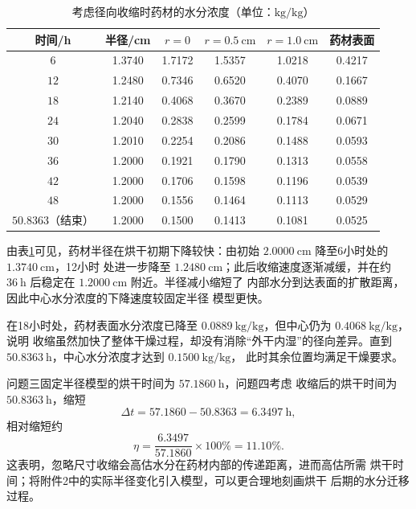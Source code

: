 \documentclass[12pt,a4paper]{article}
\begin{document}
\begin{table}[H]
\centering
\caption{考虑径向收缩时药材的水分浓度（单位：$\mathrm{kg/kg}$）}
\label{tab:q4-moisture}
\begin{tabular}{cccccc}
\toprule
时间/h & 半径/cm & $r=0$ & $r=0.5\ \mathrm{cm}$
& $r=1.0\ \mathrm{cm}$ & 药材表面\\
\midrule
$6$  & 1.3740 & 1.7172 & 1.5357 & 1.0218 & 0.4217\\
$12$ & 1.2480 & 0.7346 & 0.6520 & 0.4070 & 0.1667\\
$18$ & 1.2140 & 0.4068 & 0.3670 & 0.2389 & 0.0889\\
$24$ & 1.2040 & 0.2838 & 0.2599 & 0.1784 & 0.0671\\
$30$ & 1.2010 & 0.2254 & 0.2086 & 0.1488 & 0.0593\\
$36$ & 1.2000 & 0.1921 & 0.1790 & 0.1313 & 0.0558\\
$42$ & 1.2000 & 0.1706 & 0.1598 & 0.1196 & 0.0539\\
$48$ & 1.2000 & 0.1556 & 0.1464 & 0.1113 & 0.0529\\
$50.8363$（结束） & 1.2000 & 0.1500 & 0.1413 & 0.1081 & 0.0525\\
\bottomrule
\end{tabular}
\end{table}

由表\ref{tab:q4-moisture}可见，药材半径在烘干初期下降较快：由初始
$2.0000\ \mathrm{cm}$ 降至6小时处的 $1.3740\ \mathrm{cm}$，12小时
处进一步降至 $1.2480\ \mathrm{cm}$；此后收缩速度逐渐减缓，并在约
$36\ \mathrm{h}$ 后稳定在 $1.2000\ \mathrm{cm}$ 附近。半径减小缩短了
内部水分到达表面的扩散距离，因此中心水分浓度的下降速度较固定半径
模型更快。

在18小时处，药材表面水分浓度已降至
$0.0889\ \mathrm{kg/kg}$，但中心仍为 $0.4068\ \mathrm{kg/kg}$，说明
收缩虽然加快了整体干燥过程，却没有消除“外干内湿”的径向差异。直到
$50.8363\ \mathrm{h}$，中心水分浓度才达到 $0.1500\ \mathrm{kg/kg}$，
此时其余位置均满足干燥要求。

问题三固定半径模型的烘干时间为 $57.1860\ \mathrm{h}$，问题四考虑
收缩后的烘干时间为 $50.8363\ \mathrm{h}$，缩短
\begin{equation}
\Delta t=57.1860-50.8363=6.3497\ \mathrm{h},
\end{equation}
相对缩短约
\begin{equation}
\eta=\frac{6.3497}{57.1860}\times100\%=11.10\%.
\label{eq:q4-reduction}
\end{equation}
这表明，忽略尺寸收缩会高估水分在药材内部的传递距离，进而高估所需
烘干时间；将附件2中的实际半径变化引入模型，可以更合理地刻画烘干
后期的水分迁移过程。
\end{document}

